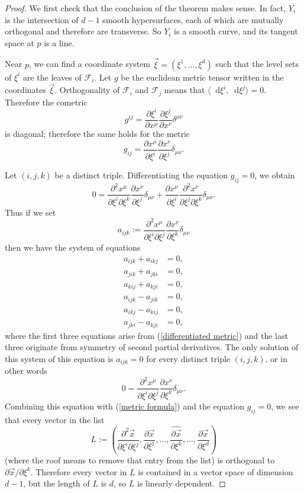 \documentclass[reqno,11pt]{amsart}
\newcommand*\dif{\mathop{}\!\mathrm{d}}
\theoremstyle{definition}
\begin{document}
\begin{proof}
We first check that the conclusion of the theorem makes sense.
In fact, $Y_i$ is the intersection of $d - 1$ smooth hypersurfaces, each of which are mutually orthogonal and therefore are transverse.
So $Y_i$ is a smooth curve, and its tangent space at $p$ is a line.

Near $p$, we can find a coordinate system $\vec \xi = (\xi^1, \dots, \xi^d)$ such that the level sets of $\xi^i$ are the leaves of $\mathscr F_i$.
Let $g$ be the euclidean metric tensor written in the coordinates $\vec \xi$.
Orthogonality of $\mathscr F_i$ and $\mathscr F_j$ means that $\langle \dif \xi^i, \dif \xi^j\rangle = 0$. 
Therefore the cometric
$$g^{ij} = \frac{\partial \xi^i}{\partial x^\mu} \frac{\partial \xi^j}{\partial x^\nu} \delta^{\mu \nu}$$
is diagonal; therefore the same holds for the metric
\begin{equation}\label{metric formula}
g_{ij} = \frac{\partial x^\mu}{\partial \xi^i} \frac{\partial x^\nu}{\partial \xi^j} \delta_{\mu \nu}.
\end{equation}

Let $(i, j, k)$ be a distinct triple.
Differentiating the equation $g_{ij} = 0$, we obtain
\begin{equation}\label{differentiated metric}
0 = \frac{\partial^2 x^\mu}{\partial \xi^i \partial \xi^k}  \frac{\partial x^\nu}{\partial \xi^j} \delta_{\mu \nu} + \frac{\partial x^\mu}{\partial \xi^i} \frac{\partial^2 x^\nu}{\partial \xi^j \partial \xi^k} \delta_{\mu \nu}.
\end{equation}
Thus if we set
$$a_{ijk} := \frac{\partial^2 x^\mu}{\partial \xi^i \partial \xi^j}  \frac{\partial x^\nu}{\partial \xi^k} \delta_{\mu \nu}$$
then we have the system of equations 
\begin{align*}
a_{ijk} + a_{ikj} &= 0, \\
a_{jik} + a_{jki} &= 0, \\
a_{kij} + a_{kji} &= 0, \\
a_{ijk} - a_{jik} &= 0, \\
a_{ikj} - a_{kij} &= 0, \\
a_{jki} - a_{kji} &= 0,
\end{align*}
where the first three equations arise from (\ref{differentiated metric}) and the last three originate from symmetry of second partial derivatives.
The only solution of this system of this equation is $a_{ijk} = 0$ for every distinct triple $(i, j, k)$, or in other words 
$$0 = \frac{\partial^2 x^\mu}{\partial \xi^i \partial \xi^j}  \frac{\partial x^\nu}{\partial \xi^k} \delta_{\mu \nu}.$$
Combining this equation with (\ref{metric formula}) and the equation $g_{ij} = 0$, we see that every vector in the list 
$$L := \left(\frac{\partial^2 \vec x}{\partial \xi^i \partial \xi^j}, \frac{\partial \vec x}{\partial \xi^1}, \dots, \widehat{\frac{\partial \vec x}{\partial \xi^k}}, \dots, \frac{\partial \vec x}{\partial \xi^d}\right)$$
(where the roof means to remove that entry from the list) is orthogonal to $\partial \vec x/\partial \xi^k$.
Therefore every vector in $L$ is contained in a vector space of dimension $d - 1$, but the length of $L$ is $d$, so $L$ is linearly dependent.


\end{proof}
\end{document}
